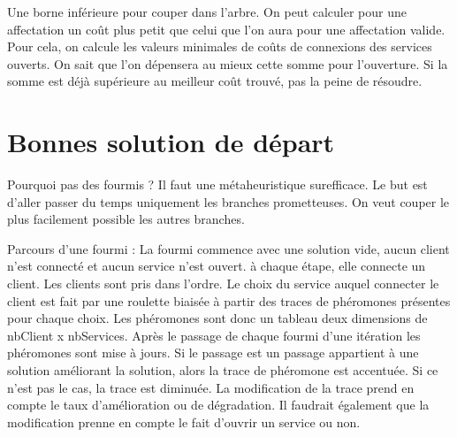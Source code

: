 Une borne inférieure pour couper dans l'arbre.
On peut calculer pour une affectation un coût plus petit que celui que l'on aura pour une affectation valide.
Pour cela, on calcule les valeurs minimales de coûts de connexions des services ouverts.
On sait que l'on dépensera au mieux cette somme pour l'ouverture. Si la somme est déjà supérieure au meilleur coût trouvé, pas la peine de résoudre.

\section{Bonnes solution de départ}

Pourquoi pas des fourmis ? Il faut une métaheuristique surefficace. Le but est d'aller passer du temps uniquement les branches prometteuses.
On veut couper le plus facilement possible les autres branches. \newline

Parcours d'une fourmi : La fourmi commence avec une solution vide, aucun client n'est connecté et aucun service n'est ouvert.
à chaque étape, elle connecte un client. Les clients sont pris dans l'ordre.
Le choix du service auquel connecter le client est fait par une roulette biaisée à partir des traces de phéromones présentes pour chaque choix.
Les phéromones sont donc un tableau deux dimensions de nbClient x nbServices.
Après le passage de chaque fourmi d'une itération les phéromones sont mise à jours.
Si le passage est un passage appartient à une solution améliorant la solution, alors la trace de phéromone est accentuée.
Si ce n'est pas le cas, la trace est diminuée. La modification de la trace prend en compte le taux d'amélioration ou de dégradation.
Il faudrait également que la modification prenne en compte le fait d'ouvrir un service ou non.
